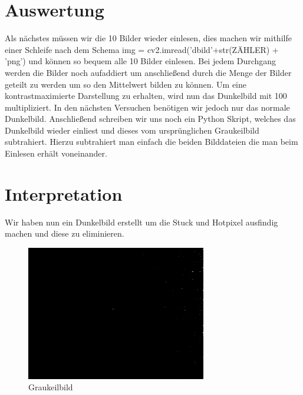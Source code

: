 \documentclass[TGAI_Laborbericht.tex]{subfiles}
\begin{document}
\section{Auswertung}
\label{chap:VERSUCH_2_AUSWERTUNG}

Als nächstes müssen wir die 10 Bilder wieder einlesen, dies machen wir mithilfe einer Schleife nach dem Schema img = cv2.imread('dbild'+str(ZÄHLER) + 'png') und können so bequem alle 10 Bilder einlesen. Bei jedem Durchgang werden die Bilder noch aufaddiert um anschließend durch die Menge der Bilder geteilt zu werden um so den Mittelwert bilden zu können. Um eine kontrastmaximierte Darstellung zu erhalten, wird nun das Dunkelbild mit 100 multipliziert. In den nächsten Versuchen benötigen wir jedoch nur das normale Dunkelbild. Anschließend schreiben wir uns noch ein Python Skript, welches das Dunkelbild wieder einliest und dieses vom ursprünglichen Graukeilbild subtrahiert. Hierzu subtrahiert man einfach die beiden Bilddateien die man beim Einlesen erhält voneinander.

\section{Interpretation}
\label{chap:VERSUCH_2_INTERPRETATION}

Wir haben nun ein Dunkelbild erstellt um die Stuck und Hotpixel ausfindig machen und diese zu eliminieren.

\begin{figure}[H]
	\includegraphics[width=0.7\textwidth]{media/test.png}
	\caption{Graukeilbild}
	\label{fig:Sensor}
\end{figure}
\end{document}
